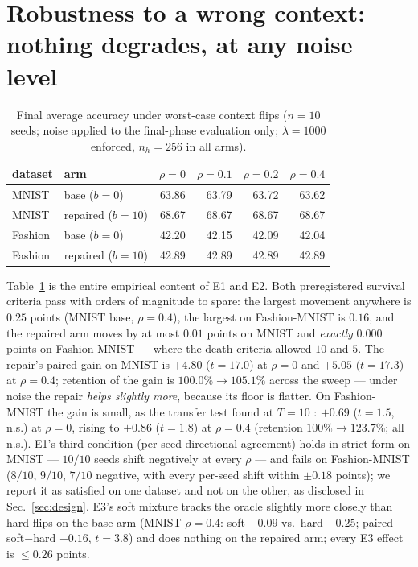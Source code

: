 \documentclass[10pt]{article}
\begin{document}
\section{Robustness to a wrong context: nothing degrades, at any noise level}
\label{sec:results}

\begin{table}[t]
\centering
\caption{Final average accuracy under worst-case context flips
($n{=}10$ seeds; noise applied to the final-phase evaluation only;
$\lambda{=}1000$ enforced, $n_h{=}256$ in all arms).}
\label{tab:main}
\begin{tabular}{llrrrr}
\toprule
dataset & arm & $\rho{=}0$ & $\rho{=}0.1$ & $\rho{=}0.2$ & $\rho{=}0.4$ \\
\midrule
MNIST    & base ($b{=}0$)    & 63.86 & 63.79 & 63.72 & 63.62 \\
MNIST    & repaired ($b{=}10$) & 68.67 & 68.67 & 68.67 & 68.67 \\
Fashion  & base ($b{=}0$)    & 42.20 & 42.15 & 42.09 & 42.04 \\
Fashion  & repaired ($b{=}10$) & 42.89 & 42.89 & 42.89 & 42.89 \\
\bottomrule
\end{tabular}
\end{table}

Table~\ref{tab:main} is the entire empirical content of E1 and E2.
Both preregistered survival criteria pass with orders of magnitude to
spare: the largest movement anywhere is $0.25$ points (MNIST base,
$\rho{=}0.4$), the largest on Fashion-MNIST is $0.16$, and the repaired
arm moves by at most $0.01$ points on MNIST and \emph{exactly} $0.000$
points on Fashion-MNIST --- where the death criteria allowed $10$ and
$5$. The repair's paired gain on MNIST is $+4.80$ ($t{=}17.0$) at
$\rho{=}0$ and $+5.05$ ($t{=}17.3$) at $\rho{=}0.4$; retention of the
gain is $100.0\% \to 105.1\%$ across the sweep --- under noise the
repair \emph{helps slightly more}, because its floor is flatter.
On Fashion-MNIST the gain is small, as the transfer test found at $T{=}10$
: $+0.69$ ($t{=}1.5$, n.s.) at $\rho{=}0$, rising
to $+0.86$ ($t{=}1.8$) at $\rho{=}0.4$ (retention $100\% \to 123.7\%$;
all n.s.). E1's third condition (per-seed directional agreement) holds
in strict form on MNIST --- $10/10$ seeds shift negatively at every
$\rho$ --- and fails on Fashion-MNIST ($8/10$, $9/10$, $7/10$ negative,
with every per-seed shift within $\pm 0.18$ points); we report it as
satisfied on one dataset and not on the other, as disclosed in
Sec.~\ref{sec:design}. E3's soft mixture tracks the oracle slightly
more closely than hard flips on the base arm (MNIST $\rho{=}0.4$: soft
$-0.09$ vs.\ hard $-0.25$; paired soft$-$hard $+0.16$, $t{=}3.8$) and
does nothing on the repaired arm; every E3 effect is ${\le} 0.26$
points.
\end{document}
